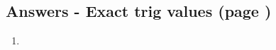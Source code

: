 \documentclass[../main.tex]{subfiles}
\begin{document}
\subsection*{Answers - Exact trig values (page \pageref{Exact trig values})}
\label{Exact trig values answers}
\begin{enumerate}[itemsep=0.7cm]
    \item 
    
\end{enumerate}
\end{document}
